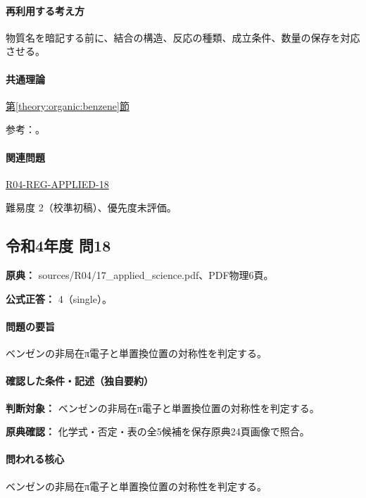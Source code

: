 \paragraph{再利用する考え方} 物質名を暗記する前に、結合の構造、反応の種類、成立条件、数量の保存を対応させる。

\paragraph{共通理論} \hyperref[theory:organic:benzene]{第\ref*{theory:organic:benzene}節}

\par 参考：\cite{organic_benzene}。

\paragraph{関連問題} \hyperref[q:r04-reg-applied-18]{R04-REG-APPLIED-18}

\par 難易度 2（校準初稿）、優先度未評価。

\subsection{令和4年度 問18}
\label{q:r04-reg-applied-18}

\noindent\textbf{原典：} sources/R04/17\_applied\_science.pdf、PDF物理6頁。

\textbf{公式正答：} 4（single）。

\paragraph{問題の要旨} ベンゼンの非局在π電子と単置換位置の対称性を判定する。

\paragraph{確認した条件・記述（独自要約）}\mbox{}\par

\noindent\textbf{判断対象：} ベンゼンの非局在π電子と単置換位置の対称性を判定する。\par

\noindent\textbf{原典確認：} 化学式・否定・表の全5候補を保存原典24頁画像で照合。\par

\paragraph{問われる核心} ベンゼンの非局在π電子と単置換位置の対称性を判定する。

